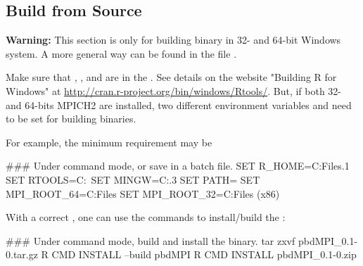 \subsection[Build from Source]{Build from Source}
\label{sec:building_from_source}

{\color{red} \bf Warning:} This section is only for building binary in
32- and 64-bit Windows system. A more general way can be found in the file
.

Make sure that , , and  are in the .
See details on the website "Building R for Windows" at
\url{http://cran.r-project.org/bin/windows/Rtools/}.
But, if both 32- and 64-bits MPICH2 are installed, two different
environment variables  and 
need to be set for building binaries.

For example, the minimum requirement may be
\begin{Command}
### Under command mode, or save in a batch file.
SET R_HOME=C:\Program Files\R{}.1
SET RTOOLS=C:\Rtools\bin\
SET MINGW=C:\Rtools{}.3\bin
SET PATH=%
SET MPI_ROOT_64=C:\Program Files
SET MPI_ROOT_32=C:\Program Files (x86)
\end{Command}

With a correct , one can use the  commands
to install/build the \pkg{pbdMPI}:
\begin{Command}
### Under command mode, build and install the binary.
tar zxvf pbdMPI_0.1-0.tar.gz
R CMD INSTALL --build pbdMPI
R CMD INSTALL pbdMPI_0.1-0.zip
\end{Command}

